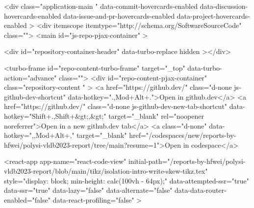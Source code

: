 {{  <div
    class="application-main "
    data-commit-hovercards-enabled
    data-discussion-hovercards-enabled
    data-issue-and-pr-hovercards-enabled
    data-project-hovercards-enabled
  >
        <div itemscope itemtype="http://schema.org/SoftwareSourceCode" class="">
    <main id="js-repo-pjax-container" >
      
      
    

    






    
  <div id="repository-container-header" data-turbo-replace hidden ></div>




<turbo-frame id="repo-content-turbo-frame" target="_top" data-turbo-action="advance" class="">
    <div id="repo-content-pjax-container" class="repository-content " >
      <a href="https://github.dev/" class="d-none js-github-dev-shortcut" data-hotkey=".,Mod+Alt+.">Open in github.dev</a>
  <a href="https://github.dev/" class="d-none js-github-dev-new-tab-shortcut" data-hotkey="Shift+.,Shift+&gt;,&gt;" target="_blank" rel="noopener noreferrer">Open in a new github.dev tab</a>
    <a class="d-none" data-hotkey=",,Mod+Alt+," target="_blank" href="/codespaces/new/reports-by-hfwei/polysi-vldb2023-report/tree/main?resume=1">Open in codespace</a>




    
      
    








<react-app
  app-name="react-code-view"
  initial-path="/reports-by-hfwei/polysi-vldb2023-report/blob/main/tikz/isolation-intro-write-skew-tikz.tex"
    style="display: block; min-height: calc(100vh - 64px);"
  data-attempted-ssr="true"
  data-ssr="true"
  data-lazy="false"
  data-alternate="false"
  data-data-router-enabled="false"
  data-react-profiling="false"
>
  
}}
